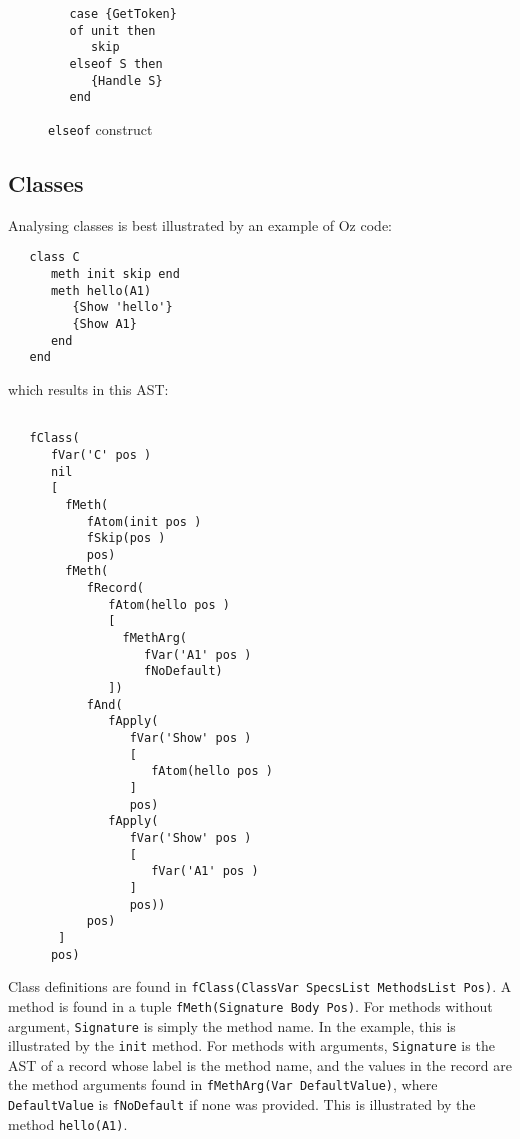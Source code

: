 \documentclass[a4paper]{memoir}
\begin{document}
\begin{figure}[h]
\begin{lstlisting}
   case {GetToken}
   of unit then
      skip
   elseof S then
      {Handle S}
   end
\end{lstlisting}
\caption{\lstinline!elseof! construct}
\label{fig:input:elseof}
\end{figure}



\subsection{Classes}
Analysing classes is best illustrated by an example of Oz code:

\begin{lstlisting}
   class C
      meth init skip end
      meth hello(A1)
         {Show 'hello'}
         {Show A1}
      end
   end
\end{lstlisting}
which results in this AST:
\begin{lstlisting}

   fClass(
      fVar('C' pos )
      nil
      [
        fMeth(
           fAtom(init pos )
           fSkip(pos )
           pos)
        fMeth(
           fRecord(
              fAtom(hello pos )
              [
                fMethArg(
                   fVar('A1' pos )
                   fNoDefault)
              ])
           fAnd(
              fApply(
                 fVar('Show' pos )
                 [
                    fAtom(hello pos )
                 ]
                 pos)
              fApply(
                 fVar('Show' pos )
                 [
                    fVar('A1' pos )
                 ]
                 pos))
           pos)
       ]
      pos)
\end{lstlisting}

Class definitions are found in 
\lstinline!fClass(ClassVar SpecsList MethodsList Pos)!.
A method is found in a tuple \lstinline!fMeth(Signature Body Pos)!.
For methods without argument, \lstinline!Signature! is simply the method name.
In the example, this is illustrated by the \lstinline!init! method.
For methods with arguments, \lstinline!Signature! is the AST of a record whose label is the method name, and the
values in the record are the method arguments found in 
\lstinline!fMethArg(Var DefaultValue)!, where \lstinline!DefaultValue! is
\lstinline!fNoDefault! if none was provided.
This is illustrated by the method \lstinline!hello(A1)!.
\end{document}
